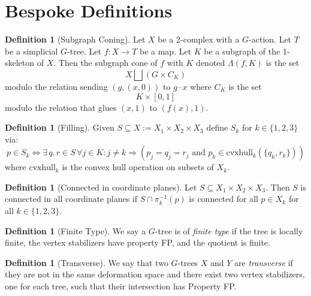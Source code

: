 \documentclass[12pt,parskip=full]{report}
\theoremstyle{plain}
\theoremstyle{definition}
\newtheorem{dfn}[thm]{Definition}
\begin{document}
\section{Bespoke Definitions}

\begin{dfn}
    [Subgraph Coning]
    \label{dfn:subgraphconing}
    Let \(X\) be a 2-complex with a \(G\)-action. Let \(T\) be a simplicial \(G\)-tree. Let \(f:X\to T\) be a map. Let \(K\) be a subgraph of the 1-skeleton of \(X\). Then the subgraph cone of \(f\) with \(K\) denoted \(\Lambda(f, K)\) is the set \[X \bigsqcup \left(G\times C_K\right)\] modulo the relation sending \((g, (x,0))\) to \(g\cdot x\) where \(C_K\) is the set \[ K\times [0,1]\] modulo the relation that glues \((x,1)\) to \((f(x), 1)\). 
\end{dfn}

\begin{dfn}
	[Filling]
	\label{defn:filling}
    Given \(S \subseteq X := X_1\times X_2\times X_3\) define \(S_{k}\) for \(k \in \{1,2,3\}\) via: 
    \[
        p \in S_{k} \iff \exists 
        \,q,r\in S\, \forall j\in K: j\neq k 
        \Longrightarrow ( p_{j} = q_{j} = r_{j}
        \text{ and } p_{k} \in \text{cvxhull}_k (\{q_{k} , r_{k}\}))
    \] 
    where \(\text{cvxhull}_k\) is the convex hull operation on subsets of \(X_k\).
\end{dfn}

\begin{dfn}
    [Connected in coordinate planes]
    \label{defn:ccp} 
    Let \(S \subseteq X_1\times X_2\times X_3\). Then \(S\) is connected in all coordinate planes if \(S \cap \pi_{k}^{-1} (p)\) is connected for all \(p \in X_{k}\) for all \(k\in \{1,2,3\}\).
    
\end{dfn}

\begin{dfn}
    [Finite Type]
    \label{defn:finitetype} 
    We say a $G$-tree is of \emph{finite type} if the tree is locally finite, the vertex stabilizers have property FP, and the quotient is finite.
\end{dfn}

\begin{dfn}
    [Transverse]
    \label{defn:transverse} 
    We say that two $G$-trees $X$ and $Y$ are \emph{transverse} if they are not in the same deformation space and there exist two vertex stabilizers, one for each tree, such that their intersection has Property FP.
\end{dfn}
\end{document}
